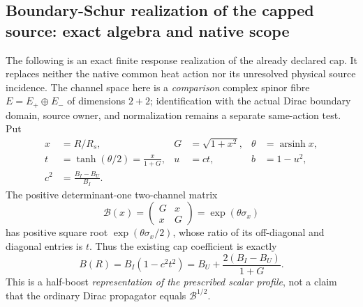 \documentclass[12pt,a4paper]{article}
\begin{document}
\subsection{Boundary-Schur realization of the capped source: exact algebra and native scope}
\label{p3e:sec:v353-schur-boundary}
The following is an exact finite response realization of the already declared
cap.  It replaces neither the native common heat action nor its unresolved
physical source incidence.  The channel space here is a \emph{comparison}
complex spinor fibre $E=E_+\oplus E_-$ of dimensions $2+2$;
identification with the actual Dirac boundary domain, source owner, and
normalization remains a separate same-action test.  Put
\[
\begin{aligned}
 x&=R/R_s,& G&=\sqrt{1+x^2},&
 \theta&=\operatorname{arsinh}x,\\
 t&=\tanh(\theta/2)=\frac{x}{1+G},&
 u&=ct,& b&=1-u^2,\\
 c^2&=\frac{B_I-B_U}{B_I}.
\end{aligned}
\]
The positive determinant-one two-channel matrix
\[
 \mathcal B(x)=\begin{pmatrix}G&x\\x&G\end{pmatrix}
 =\exp(\theta\sigma_x)
\]
has positive square root $\exp(\theta\sigma_x/2)$, whose ratio of
its off-diagonal and diagonal entries is $t$.  Thus the existing
cap coefficient is exactly
\begin{equation}
\label{p3e:eq:v353-halfboost-cap}
 B(R)=B_I(1-c^2t^2)
     =B_U+\frac{2(B_I-B_U)}{1+G}.
\end{equation}
This is a half-boost \emph{representation of the prescribed scalar
profile}, not a claim that the ordinary Dirac propagator equals
$\mathcal B^{1/2}$.
\end{document}
